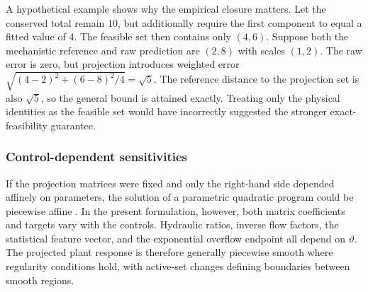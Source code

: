 A hypothetical example shows why the empirical closure matters. Let the conserved total remain 10, but additionally require the first component to equal a fitted value of 4. The feasible set then contains only $(4,6)$. Suppose both the mechanistic reference and raw prediction are $(2,8)$ with scales $(1,2)$. The raw error is zero, but projection introduces weighted error $\sqrt{(4-2)^2+(6-8)^2/4}=\sqrt5$. The reference distance to the projection set is also $\sqrt5$, so the general bound is attained exactly. Treating only the physical identities as the feasible set would have incorrectly suggested the stronger exact-feasibility guarantee.

\subsubsection{Control-dependent sensitivities}

If the projection matrices were fixed and only the right-hand side depended affinely on parameters, the solution of a parametric quadratic program could be piecewise affine \citep{Tondel2003}. In the present formulation, however, both matrix coefficients and targets vary with the controls. Hydraulic ratios, inverse flow factors, the statistical feature vector, and the exponential overflow endpoint all depend on $\vartheta$. The projected plant response is therefore generally piecewise smooth where regularity conditions hold, with active-set changes defining boundaries between smooth regions.

